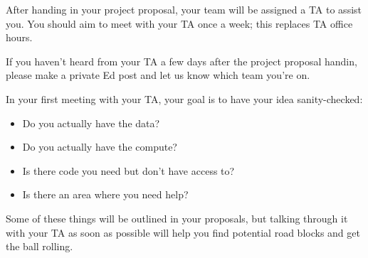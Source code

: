 After handing in your project proposal, your team will be assigned a TA to assist you.
You should aim to meet with your TA once a week; this replaces TA office hours.

If you haven't heard from your TA a few days after the project proposal handin, please make a private Ed post and let us know which team you're on.

In your first meeting with your TA, your goal is to have your idea sanity-checked:

\begin{itemize}
  \item Do you actually have the data?
  \item Do you actually have the compute?
  \item Is there code you need but don't have access to?
  \item Is there an area where you need help?
\end{itemize}

Some of these things will be outlined in your proposals, but talking through it with your TA as soon as possible will help you find potential road blocks and get the ball rolling.

